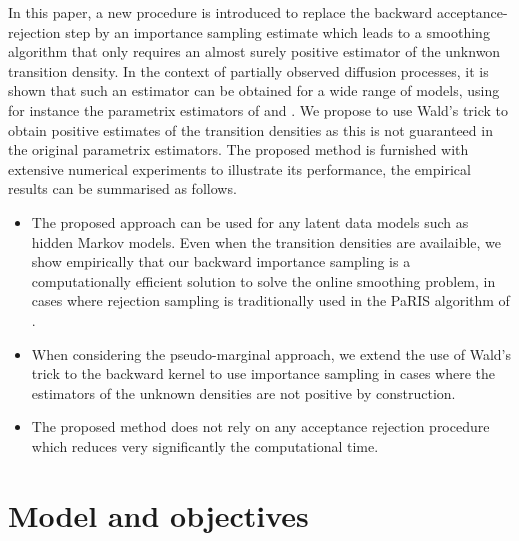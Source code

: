 \documentclass{article}
\begin{document}
In this paper, a new procedure is introduced to  replace the backward acceptance-rejection step by an importance sampling estimate which leads to a smoothing algorithm that only requires an almost surely positive estimator of the unknwon transition density. In the context of partially observed diffusion processes, it is shown that such an estimator can be obtained for a wide range of models, using for instance the parametrix estimators of \cite{andersson2017unbiased} and \cite{fearnhead2017continuous}.  We propose to use Wald's trick to obtain positive estimates of the transition densities as this is not guaranteed in the original parametrix estimators.
The proposed method is furnished with extensive numerical experiments to illustrate its performance, the empirical results can be summarised as follows.
\begin{itemize}
\item The proposed approach can be used for any latent data models such as hidden Markov models. Even when the transition densities are availaible, we show empirically that our backward importance sampling is a computationally efficient solution to solve the online smoothing problem, in cases where rejection sampling is  traditionally used in the PaRIS algorithm of \cite{olsson2017efficient}.
\item When considering the pseudo-marginal approach, we extend the use of Wald's trick to the backward kernel to use importance sampling in cases where the estimators of the unknown densities  are not positive by construction.
\item The proposed method does not rely on any acceptance rejection procedure which reduces very significantly the computational time. 
\end{itemize}

\section{Model and objectives}
\label{sec:model}
\end{document}
